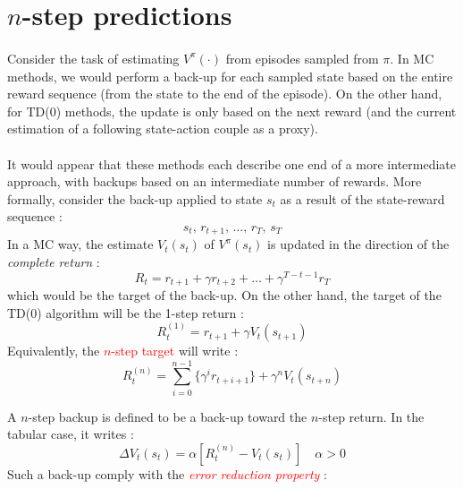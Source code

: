 \documentclass[a4paper]{article}
\begin{document}
	\section{$n$-step predictions}
	{
		\paragraph{} Consider the task of estimating $V^{\pi}(\cdot)$ from episodes sampled from $\pi$. In MC methods, we would perform a back-up for each sampled state based on the entire reward sequence (from the state to the end of the episode). On the other hand, for TD($0$) methods, the update is only based on the next reward (and the current estimation of a following state-action couple as a proxy). 
		
		\paragraph{} It would appear that these methods each describe one end of a more intermediate approach, with backups based on an intermediate number of rewards. More formally, consider the back-up applied to state $s_t$ as a result of the state-reward sequence :
		$$
			s_t, \,r_{t+1},\,\hdots, \,r_T,\, s_T
		$$
		In a MC way, the estimate $V_t(s_t)$ of $V^\pi(s_t)$ is updated in the direction of the \emph{complete return} : 
		\begin{equation}
			R_t = r_{t+1} + \gamma r_{t+2} +\hdots + \gamma^{T-t-1} r_{T}
		\end{equation}
		which would be the target of the back-up. On the other hand, the target of the TD(0) algorithm will be the 1-step return : 
		\begin{equation}
			R_t^{(1)} = r_{t+1} + \gamma V_t(s_{t+1})
		\end{equation}
		Equivalently, the \textcolor{red}{$n$-step target} will write : 
		\begin{equation}
			R_t^{(n)} = \sum_{i=0}^{n-1}\{\gamma^i r_{t+i+1}\} + \gamma^n V_t(s_{t+n})
		\end{equation}
		
		\noindent A $n$-step backup is defined to be a back-up toward the $n$-step return. In the tabular case, it writes : 
		\begin{equation}
			\Delta V_t(s_t) = \alpha\left[ R_{t}^{(n)} - V_t(s_t)\right] \quad \alpha>0
		\end{equation}
		Such a back-up comply with the \emph{\textcolor{red}{error reduction property}} : 
		\vspace{5pt}
		
}
\end{document}
